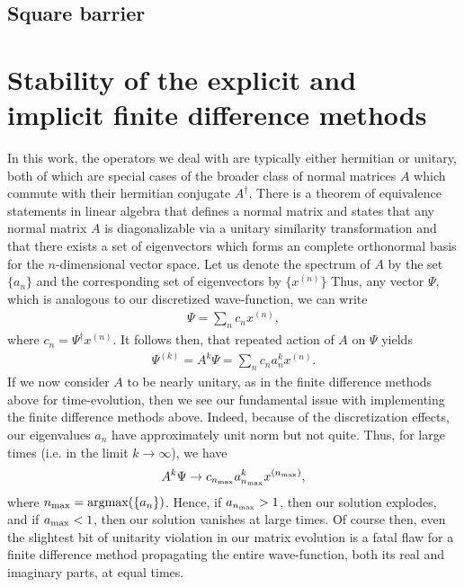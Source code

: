 \subsection{Square barrier}




\appendix

\section{Stability of the explicit and implicit finite difference methods}
\label{app:stability-of-the-explicity-and-implicit-finite-difference-methods}

In this work, the operators we deal with are typically either hermitian or unitary, both of which are special cases of the broader class of normal matrices $A$ which commute with their hermitian conjugate $A^{\dagger}$.
There is a theorem of equivalence statements in linear algebra that defines a normal matrix and states that any normal matrix $A$ is diagonalizable via a unitary similarity transformation and that there exists a set of eigenvectors which forms an complete orthonormal basis for the $n$-dimensional vector space.
Let us denote the spectrum of $A$ by the set $\{ a_{n} \}$ and the corresponding set of eigenvectors by $\{ x^{(n)} \}$
Thus, any vector $\Psi$, which is analogous to our discretized wave-function, we can write
\begin{align}
    \Psi = \sum_{n} c_{n} x^{(n)}
,\end{align}
where $c_{n} = \Psi^{\dagger} x^{(n)}$.
It follows then, that repeated action of $A$ on $\Psi$ yields
\begin{align}
    \Psi^{(k)} = A^{k} \Psi = \sum_{n} c_{n} a_{n}^{k} x^{(n)}
.\end{align}
If we now consider $A$ to be nearly unitary, as in the finite difference methods above for time-evolution, then we see our fundamental issue with implementing the finite difference methods above.
Indeed, because of the discretization effects, our eigenvalues $a_{n}$ have approximately unit norm but not quite.
Thus, for large times (i.e. in the limit $k \rightarrow \infty$), we have
\begin{align}
    A^{k} \Psi \rightarrow c_{n_{\rm max}} a_{n_{\rm max}}^{k} x^{(n_{\rm max})}
,\end{align}
where $n_{\rm max} = {\rm argmax}(\{ a_{n} \})$.
Hence, if $a_{n_{\rm max}} > 1$, then our solution explodes, and if $a_{\rm max} < 1$, then our solution vanishes at large times.
Of course then, even the slightest bit of unitarity violation in our matrix evolution is a fatal flaw for a finite difference method propagating the entire wave-function, both its real and imaginary parts, at equal times.

